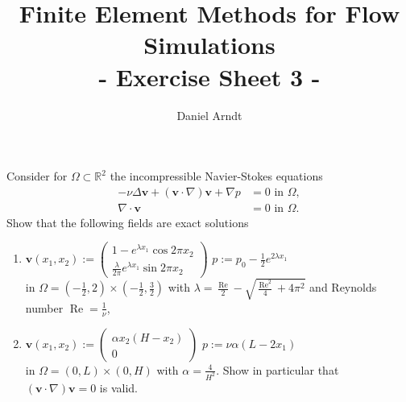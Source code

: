 \documentclass[12pt]{article}
\newcommand{\bv}{\boldsymbol{v}}
\newenvironment{exercise}[2][Exercise]{\begin{trivlist}
\item[\hskip \labelsep {\bfseries #1}\hskip \labelsep {\bfseries #2.}]}{\end{trivlist}}
\begin{document}
 
\title{Finite Element Methods for Flow Simulations\\ - Exercise Sheet 3 -}
\author{Daniel Arndt}
\date{}
 
\maketitle

\begin{exercise}{5}
Consider for $\Omega \subset \mathbb{R}^2$ the incompressible Navier-Stokes equations
\begin{align*}
-\nu \Delta \bv + (\bv \cdot \nabla)\bv + \nabla p &= 0 \text{ in } \Omega , \\
\nabla \cdot \bv &= 0 \text{ in } \Omega.
\end{align*}
Show that the following fields are exact solutions
\begin{enumerate}
 \item \hfill
    $\bv(x_1, x_2) := \begin{pmatrix}1 - e^{\lambda x_1} \cos 2\pi x_2 \\ \frac{\lambda}{2\pi}e^{\lambda x_1} \sin 2\pi x_2\end{pmatrix}$\hfill
      $p := p_0 - \frac{1}{2} e^{2\lambda x_1}$ \hfill~\\
     in $\Omega = (-\frac{1}{2}, 2) \times (-\frac{1}{2}, \frac{3}{2})$ with $\lambda=\frac{\operatorname{Re}}{2}-\sqrt{\frac{\operatorname{Re}^2}{4}+4\pi^2}$
     and Reynolds number $\operatorname{Re}=\frac{1}{\nu}$,
\item \hfill
   $\bv(x_1, x_2)  := \begin{pmatrix}\alpha x_2 (H - x_2 )\\ 0\end{pmatrix}$ \hfill $p := \nu \alpha (L - 2x_1)$ \hfill ~\\ 
 in $\Omega = (0, L) \times (0, H)$ with $\alpha = \frac{4}{H^2}$. Show in particular that $(\bv \cdot \nabla)\bv = 0$ is valid.
\end{enumerate}
\end{exercise}
\end{document}
